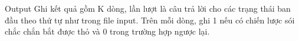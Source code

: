 Output
Ghi kết quả gồm K dòng, lần lượt là câu trả lời cho các trạng thái ban đầu theo thứ tự như trong file input. Trên mỗi dòng, ghi 1 nếu có chiến lược sói chắc chắn bắt được thỏ và 0 trong trường hợp ngược lại.